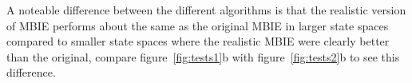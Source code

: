 A noteable difference between the different algorithms is that the realistic version of MBIE performs about the same as the original MBIE in larger state spaces compared to smaller state spaces where the realistic MBIE were clearly better than the original, compare figure~\ref{fig:tests1}b with figure~\ref{fig:tests2}b to see this difference. 

